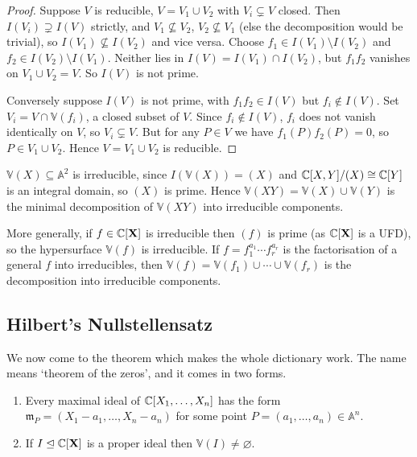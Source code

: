 \documentclass[a4paper]{scrartcl}
\newcommand{\A}{\mathbb{A}}
\newcommand{\V}{\mathbb{V}}
\newcommand{\mm}{\mathfrak{m}}
\begin{document}
\begin{proof}
	Suppose $V$ is reducible, $V = V_1 \cup V_2$ with $V_i \subsetneq V$ closed. Then $I(V_i) \supsetneq I(V)$ strictly, and $V_1 \not\subseteq V_2$, $V_2 \not\subseteq V_1$ (else the decomposition would be trivial), so $I(V_1) \not\subseteq I(V_2)$ and vice versa. Choose $f_1 \in I(V_1)\setminus I(V_2)$ and $f_2 \in I(V_2)\setminus I(V_1)$. Neither lies in $I(V) = I(V_1) \cap I(V_2)$, but $f_1f_2$ vanishes on $V_1 \cup V_2 = V$. So $I(V)$ is not prime.

	Conversely suppose $I(V)$ is not prime, with $f_1f_2 \in I(V)$ but $f_i \notin I(V)$. Set $V_i = V \cap \V(f_i)$, a closed subset of $V$. Since $f_i \notin I(V)$, $f_i$ does not vanish identically on $V$, so $V_i \subsetneq V$. But for any $P \in V$ we have $f_1(P)f_2(P) = 0$, so $P \in V_1 \cup V_2$. Hence $V = V_1 \cup V_2$ is reducible.
\end{proof}

\begin{example}
	$\V(X) \subseteq \A^2$ is irreducible, since $I(\V(X)) = (X)$ and $\mathbb{C}[X,Y]/(X) \cong \mathbb{C}[Y]$ is an integral domain, so $(X)$ is prime. Hence $\V(XY) = \V(X) \cup \V(Y)$ is the minimal decomposition of $\V(XY)$ into irreducible components.
\end{example}

\begin{example}
	More generally, if $f \in \mathbb{C}[\mathbf{X}]$ is irreducible then $(f)$ is prime (as $\mathbb{C}[\mathbf{X}]$ is a UFD), so the hypersurface $\V(f)$ is irreducible. If $f = f_1^{a_1}\cdots f_r^{a_r}$ is the factorisation of a general $f$ into irreducibles, then $\V(f) = \V(f_1) \cup \cdots \cup \V(f_r)$ is the decomposition into irreducible components.
\end{example}

\subsection{Hilbert's Nullstellensatz}

We now come to the theorem which makes the whole dictionary work. The name means `theorem of the zeros', and it comes in two forms.

\begin{theorem}\label{thm:weaknss}
	\begin{enumerate}[label=(\roman*)]
		\item Every maximal ideal of $\mathbb{C}[X_1,\dots,X_n]$ has the form $\mm_P = (X_1-a_1,\dots,X_n-a_n)$ for some point $P = (a_1,\dots,a_n) \in \A^n$.
		\item If $I \trianglelefteq \mathbb{C}[\mathbf{X}]$ is a proper ideal then $\V(I) \neq \varnothing$.
	\end{enumerate}
\end{theorem}
\end{document}
